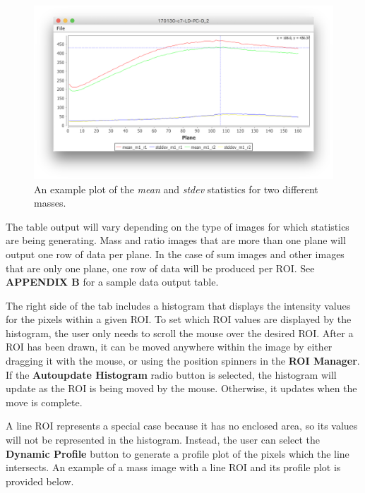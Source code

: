 \documentclass{article}
\begin{document}
   	\begin{figure}[!ht]
	\centering
	\includegraphics[scale=0.82]{snapshotTomographyPlot.png}
	\caption{An example plot of the \textit{mean} and \textit{stdev} statistics for two different masses.}
	\end{figure}

	The table output will vary depending on the type of images for which
	statistics are being generating. Mass and ratio images that are more
	than one plane will output one row of data per plane. In the case of
	sum images and other images that are only one plane, one row of data
	will be produced per ROI. See \textbf{APPENDIX B} for a sample data output table.
	
	The right side of the tab includes a histogram that displays the intensity values for 
	the pixels within a given ROI.
	To set which ROI values are displayed by the histogram, the user only needs to 
	scroll the mouse over the desired ROI. After a ROI has been drawn, it can be moved
	anywhere within the image by either dragging it with the mouse, or using the position
	spinners in the \textbf{ROI Manager}. If the \textbf{Autoupdate Histogram} radio 
	button is selected, the histogram will update as the ROI is being moved by the mouse.
	Otherwise, it updates when the move is complete.

	A line ROI represents a special case because it has no enclosed area, so its values will
	not be represented in the histogram. Instead, the user can select the \textbf{Dynamic
	Profile} button to generate a profile plot of the pixels which the line intersects. An
	example of a mass image with a line ROI and its profile plot is provided below.
\end{document}
